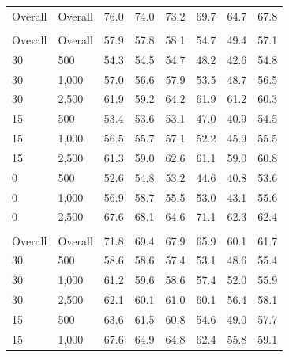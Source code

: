 \documentclass{article}\usepackage[]{graphicx}\usepackage[]{xcolor}
\newenvironment{knitrout}{}{} %
\begin{document}
\begin{knitrout}
\begin{landscape}
\begin{longtable}[t]{llcccccc}
\endfoot
\bottomrule
\endlastfoot
Overall & Overall & 76.0 & 74.0 & 73.2 & 69.7 & 64.7 & 67.8\\
\addlinespace[0.3em]
\multicolumn{8}{l}{\textit{\textbf{Interactions}}}\\
\hline
\hspace{1em}Overall & Overall & 57.9 & 57.8 & 58.1 & 54.7 & 49.4 & 57.1\\
\hspace{1em}30 & 500 & 54.3 & 54.5 & 54.7 & 48.2 & 42.6 & 54.8\\
\hspace{1em}30 & 1,000 & 57.0 & 56.6 & 57.9 & 53.5 & 48.7 & 56.5\\
\hspace{1em}30 & 2,500 & 61.9 & 59.2 & 64.2 & 61.9 & 61.2 & 60.3\\
\hspace{1em}15 & 500 & 53.4 & 53.6 & 53.1 & 47.0 & 40.9 & 54.5\\
\hspace{1em}15 & 1,000 & 56.5 & 55.7 & 57.1 & 52.2 & 45.9 & 55.5\\
\hspace{1em}15 & 2,500 & 61.3 & 59.0 & 62.6 & 61.1 & 59.0 & 60.8\\
\hspace{1em}0 & 500 & 52.6 & 54.8 & 53.2 & 44.6 & 40.8 & 53.6\\
\hspace{1em}0 & 1,000 & 56.9 & 58.7 & 55.5 & 53.0 & 43.1 & 55.6\\
\hspace{1em}0 & 2,500 & 67.6 & 68.1 & 64.6 & 71.1 & 62.3 & 62.4\\
\addlinespace[0.3em]
\multicolumn{8}{l}{\textit{\textbf{Non-linear effects}}}\\
\hline
\hspace{1em}Overall & Overall & 71.8 & 69.4 & 67.9 & 65.9 & 60.1 & 61.7\\
\hspace{1em}30 & 500 & 58.6 & 58.6 & 57.4 & 53.1 & 48.6 & 55.4\\
\hspace{1em}30 & 1,000 & 61.2 & 59.6 & 58.6 & 57.4 & 52.0 & 55.9\\
\hspace{1em}30 & 2,500 & 62.1 & 60.1 & 61.0 & 60.1 & 56.4 & 58.1\\
\hspace{1em}15 & 500 & 63.6 & 61.5 & 60.8 & 54.6 & 49.0 & 57.7\\
\hspace{1em}15 & 1,000 & 67.6 & 64.9 & 64.8 & 62.4 & 55.8 & 59.1\\

\end{longtable}
\end{landscape}
\end{knitrout}
\end{document}
